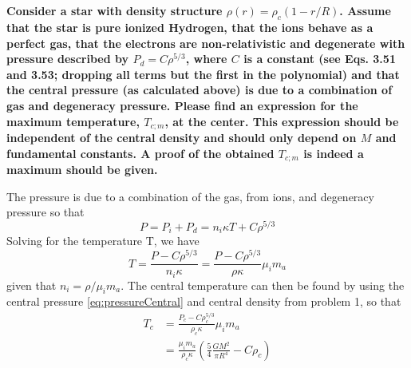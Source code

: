 \section{}
\textbf{Consider a star with density structure $\rho(r)=\rho_c(1 - r/R)$.
Assume that the star is pure ionized Hydrogen, that the ions behave as a perfect gas, that the electrons are non-relativistic and degenerate with pressure described by $P_d = C\rho^{5/3}$, where $C$ is a constant (see Eqs. 3.51 and 3.53; dropping all terms but the first in the polynomial) and that the central pressure (as calculated above) is due to a combination of gas and degeneracy pressure.
Please find an expression for the maximum temperature, $T_{c;m}$, at the center.
This expression should be independent of the central density and should only depend on $M$ and fundamental constants. A proof of the obtained $T_{c;m}$ is indeed a maximum should be given.}

The pressure is due to a combination of the gas, from ions, and degeneracy pressure so that
\begin{equation*}
    P= P_i + P_d = n_i\kappa T + C\rho^{5/3}
\end{equation*}
Solving for the temperature T, we have
\begin{equation}
    T= \frac{P - C\rho^{5/3}}{n_i\kappa}=\frac{P - C\rho^{5/3}}{\rho\kappa}\mu_i m_a
\end{equation}
given that $n_i = \rho / \mu_i m_a$. 
The central temperature can then be found by using the central pressure \ref{eq:pressureCentral} and central density from problem 1, so that
\begin{align}
    T_c &= \frac{P_c - C\rho_c^{5/3}}{\rho_c\kappa}\mu_i m_a\\
    &= \frac{\mu_i m_a}{\rho_c\kappa}\left(\frac{5}{4}\frac{GM^2}{\pi R^4} - C\rho_c\right)
\end{align}


\clearpage
